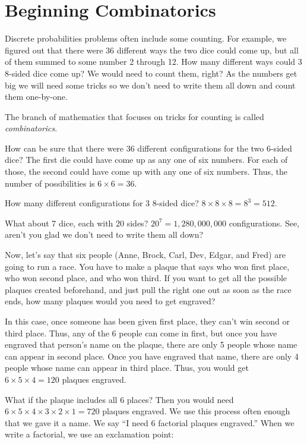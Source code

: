 \chapter{Beginning Combinatorics}

Discrete probabilities problems often include some counting. For
example, we figured out that there were 36 different ways the two dice
could come up, but all of them summed to some number 2 through 12. How
many different ways could 3 8-sided dice come up? We would need to
count them, right? As the numbers get big we will need some tricks so
we don't need to write them all down and count them one-by-one.

The branch of mathematics that focuses on tricks for counting is
called \textit{combinatorics}.

How can be sure that there were 36 different configurations for the
two 6-sided dice? The first die could have come up as any one of six
numbers. For each of those, the second could have come up with any one
of six numbers.  Thus, the number of possibilities is $ 6 \times 6 =
36.$

How many different configurations for 3 8-sided dice?  $8 \times 8
\times 8 = 8^3 = 512$.

What about 7 dice, each with 20 sides? $20^7=1,280,000,000$
configurations.  See, aren't you glad we don't need to write them all
down?

Now, let's say that six people (Anne, Brock, Carl, Dev, Edgar, and Fred) are
going to run a race. You have to make a plaque that says who won first
place, who won second place, and who won third. If you want to get all
the possible plaques created beforehand, and just pull the right one
out as soon as the race ends, how many plaques would you need to get
engraved?

In this case, once someone has been given first place, they can't win
second or third place.  Thus, any of the 6 people can come in first,
but once you have engraved that person's name on the plaque, there are
only 5 people whose name can appear in second place.  Once you have
engraved that name, there are only 4 people whose name can appear in
third place.  Thus, you would get $6 \times 5 \times 4 = 120$ plaques
engraved.

What if the plaque includes all 6 places?  Then you would need $6 \times 5
\times 4 \times 3 \times 2 \times 1 = 720$ plaques engraved.  We use
this process often enough that we gave it a name.  We say ``I need 6
factorial plaques engraved.''  When we write a factorial, we use an
exclamation point:


